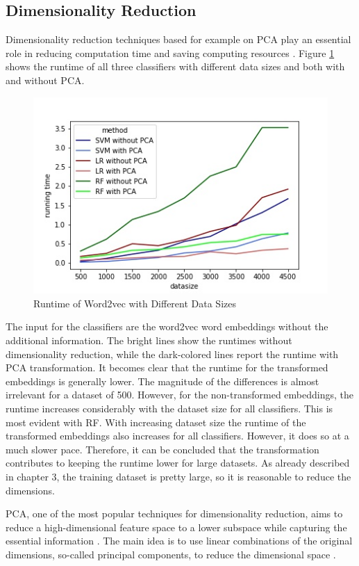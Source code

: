 \documentclass[12pt, a4paper, titlepage]{article}
\begin{document}
\subsection{Dimensionality Reduction}
Dimensionality reduction techniques based for example on \ac{PCA} play an essential role in reducing computation time and saving computing resources \citep{ayesha2020}. Figure \ref{fig: F6} shows the runtime of all three classifiers with different data sizes and both with and without \ac{PCA}. 

\begin{figure}[]
  \center
  \includegraphics[scale=0.5]{running_time_PCA.jpeg}
  \caption{\label{fig: F6} Runtime of Word2vec with Different Data Sizes}
\end{figure}

The input for the classifiers are the word2vec word embeddings without the additional information. The bright lines show the runtimes without dimensionality reduction, while the dark-colored lines report the runtime with \ac{PCA} transformation. It becomes clear that the runtime for the transformed embeddings is generally lower. The magnitude of the differences is almost irrelevant for a dataset of 500. However, for the non-transformed embeddings, the runtime increases considerably with the dataset size for all classifiers. This is most evident with \ac{RF}. With increasing dataset size the runtime of the transformed embeddings also increases for all classifiers. However, it does so at a much slower pace. Therefore, it can be concluded that the transformation contributes to keeping the runtime lower for large datasets. As already described in chapter 3, the training dataset is pretty large, so it is reasonable to reduce the dimensions. 

\ac{PCA}, one of the most popular techniques for dimensionality reduction, aims to reduce a high-dimensional feature space to a lower subspace while capturing the essential information \citep{tipping1999, bisong2019}. The main idea is to use linear combinations of the original dimensions, so-called principal components, to reduce the dimensional space \citep{bro2014,geladi2017}.
\end{document}
